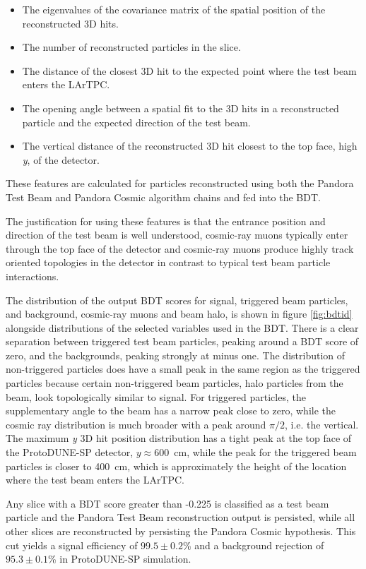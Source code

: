 \begin{itemize}
\item The eigenvalues of the covariance matrix of the spatial position of the reconstructed 3D hits.
\item The number of reconstructed particles in the slice.
\item The distance of the closest 3D hit to the expected point where the test beam enters the LArTPC.
\item The opening angle between a spatial fit to the 3D hits in a reconstructed particle and the expected direction of the test beam.
\item The vertical distance of the reconstructed 3D hit closest to the top face, high \textit{y}, of the detector.
\end{itemize}

These features are calculated for particles reconstructed using both the Pandora Test Beam and Pandora Cosmic algorithm chains and fed into the BDT.  

The justification for using these features is that the entrance position and direction of the test beam is well understood, cosmic-ray muons typically enter through the top face of the detector and cosmic-ray muons produce highly track oriented topologies in the detector in contrast to typical test beam particle interactions. 

The distribution of the output BDT scores for signal, triggered beam particles, and background, cosmic-ray muons and beam halo, is shown in figure \ref{fig:bdtid} alongside distributions of the selected variables used in the BDT.  There is a clear separation between triggered test beam particles, peaking around a BDT score of zero, and the backgrounds, peaking strongly at minus one.  The distribution of non-triggered particles does have a small peak in the same region as the triggered particles because certain non-triggered beam particles, halo particles from the beam, look topologically similar to signal.  For triggered particles, the supplementary angle to the beam has a narrow peak close to zero, while the cosmic ray distribution is much broader with a peak around $\pi/2$, i.e. the vertical.  The maximum \textit{y} 3D hit position distribution has a tight peak at the top face of the ProtoDUNE-SP detector, $y \approx 600$~cm, while the peak for the triggered beam particles is closer to 400~cm, which is approximately the height of the location where the test beam enters the LArTPC.

Any slice with a BDT score greater than -0.225 is classified as a test beam particle and the Pandora Test Beam reconstruction output is persisted, while all other slices are reconstructed by persisting the Pandora Cosmic hypothesis.  This cut yields a signal efficiency of $99.5 \pm 0.2$\% and a background rejection of $95.3 \pm 0.1$\% in ProtoDUNE-SP simulation.

